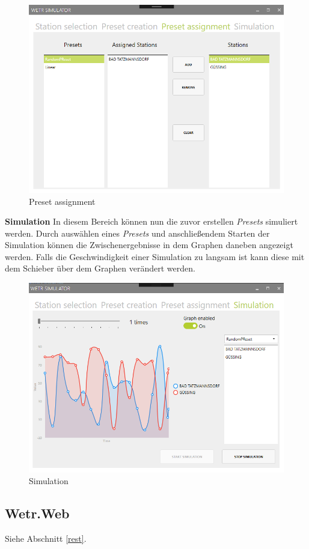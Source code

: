 \begin{figure}[H]
\centering
\includegraphics[width=.7\textwidth]{pictures/Simulator/Simulator_3_PresetAssignment.png}
\caption{Preset assignment}
\label{fig:Wetr.Simulator.Wpf.PresetAssignment}
\end{figure}
\raggedright

\textbf{Simulation}\newline
In diesem Bereich können nun die zuvor erstellen \textit{Presets} simuliert werden. Durch auswählen eines \textit{Presets} und anschließendem Starten der Simulation können die Zwischenergebnisse in dem Graphen daneben angezeigt werden. 
Falls die Geschwindigkeit einer Simulation zu langsam ist kann diese mit dem Schieber über dem Graphen verändert werden.

\begin{figure}[H]
\centering
\includegraphics[width=.7\textwidth]{pictures/Simulator/Simulator_4_Simulation.png}
\caption{Simulation}
\label{fig:Wetr.Simulator.Wpf.Simulation}
\end{figure}
\raggedright

\newpage

\subsection{Wetr.Web}
Siehe Abschnitt \ref{rest}.

